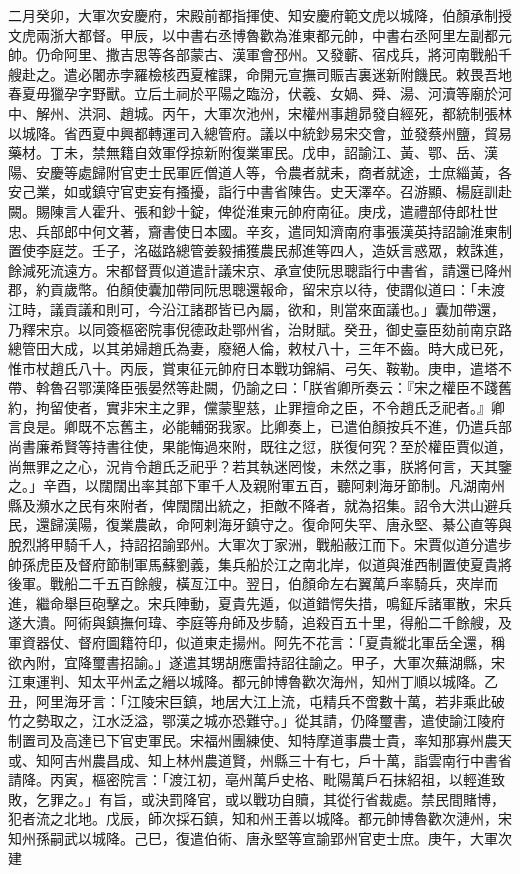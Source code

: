 \begin{pinyinscope}
 二月癸卯，大軍次安慶府，宋殿前都指揮使、知安慶府範文虎以城降，伯顏承制授文虎兩浙大都督。甲辰，以中書右丞博魯歡為淮東都元帥，中書右丞阿里左副都元帥。仍命阿里、撒吉思等各部蒙古、漢軍會邳州。又發蘄、宿戍兵，將河南戰船千艘赴之。遣必闍赤孛羅檢核西夏榷課，命開元宣撫司賑吉裏迷新附饑民。敕畏吾地春夏毋獵孕字野獸。立后土祠於平陽之臨汾，伏羲、女媧、舜、湯、河瀆等廟於河中、解州、洪洞、趙城。丙午，大軍次池州，宋權州事趙昴發自經死，都統制張林以城降。省西夏中興都轉運司入總管府。議以中統鈔易宋交會，並發蔡州鹽，貿易藥材。丁未，禁無籍自效軍俘掠新附復業軍民。戊申，詔諭江、黃、鄂、岳、漢陽、安慶等處歸附官吏士民軍匠僧道人等，令農者就耒，商者就途，士庶緇黃，各安己業，如或鎮守官吏妄有搔擾，詣行中書省陳告。史天澤卒。召游顯、楊庭訓赴闕。賜陳言人霍升、張和鈔十錠，俾從淮東元帥府南征。庚戌，遣禮部侍郎杜世忠、兵部郎中何文著，齎書使日本國。辛亥，遣同知濟南府事張漢英持詔諭淮東制置使李庭芝。壬子，洺磁路總管姜毅捕獲農民郝進等四人，造妖言惑眾，敕誅進，餘減死流遠方。宋都督賈似道遣計議宋京、承宣使阮思聰詣行中書省，請還已降州郡，約貢歲幣。伯顏使囊加帶同阮思聰還報命，留宋京以待，使謂似道曰：「未渡江時，議貢議和則可，今沿江諸郡皆已內屬，欲和，則當來面議也。」囊加帶還，乃釋宋京。以同簽樞密院事倪德政赴鄂州省，治財賦。癸丑，御史臺臣劾前南京路總管田大成，以其弟婦趙氏為妻，廢絕人倫，敕杖八十，三年不齒。時大成已死，惟市杖趙氏八十。丙辰，賞東征元帥府日本戰功錦絹、弓矢、鞍勒。庚申，遣塔不帶、斡魯召鄂漢降臣張晏然等赴闕，仍諭之曰：「朕省卿所奏云：『宋之權臣不踐舊約，拘留使者，實非宋主之罪，儻蒙聖慈，止罪擅命之臣，不令趙氏乏祀者。』卿言良是。卿既不忘舊主，必能輔弼我家。比卿奏上，已遣伯顏按兵不進，仍遣兵部尚書廉希賢等持書往使，果能悔過來附，既往之愆，朕復何究？至於權臣賈似道，尚無罪之之心，況肯令趙氏乏祀乎？若其執迷罔悛，未然之事，朕將何言，天其鑒之。」辛酉，以闊闊出率其部下軍千人及親附軍五百，聽阿剌海牙節制。凡湖南州縣及瀕水之民有來附者，俾闊闊出統之，拒敵不降者，就為招集。詔令大洪山避兵民，還歸漢陽，復業農畝，命阿剌海牙鎮守之。復命阿失罕、唐永堅、綦公直等與脫烈將甲騎千人，持詔招諭郢州。大軍次丁家洲，戰船蔽江而下。宋賈似道分遣步帥孫虎臣及督府節制軍馬蘇劉義，集兵船於江之南北岸，似道與淮西制置使夏貴將後軍。戰船二千五百餘艘，橫亙江中。翌日，伯顏命左右翼萬戶率騎兵，夾岸而進，繼命舉巨砲擊之。宋兵陣動，夏貴先遁，似道錯愕失措，鳴鉦斥諸軍散，宋兵遂大潰。阿術與鎮撫何瑋、李庭等舟師及步騎，追殺百五十里，得船二千餘艘，及軍資器仗、督府圖籍符印，似道東走揚州。阿先不花言：「夏貴縱北軍岳全還，稱欲內附，宜降璽書招諭。」遂遣其甥胡應雷持詔往諭之。甲子，大軍次蕪湖縣，宋江東運判、知太平州孟之縉以城降。都元帥博魯歡次海州，知州丁順以城降。乙丑，阿里海牙言：「江陵宋巨鎮，地居大江上流，屯精兵不啻數十萬，若非乘此破竹之勢取之，江水泛溢，鄂漢之城亦恐難守。」從其請，仍降璽書，遣使諭江陵府制置司及高達已下官吏軍民。宋福州團練使、知特摩道事農士貴，率知那寡州農天或、知阿吉州農昌成、知上林州農道賢，州縣三十有七，戶十萬，詣雲南行中書省請降。丙寅，樞密院言：「渡江初，亳州萬戶史格、毗陽萬戶石抹紹祖，以輕進致敗，乞罪之。」有旨，或決罰降官，或以戰功自贖，其從行省裁處。禁民間賭博，犯者流之北地。戊辰，師次採石鎮，知和州王善以城降。都元帥博魯歡次漣州，宋知州孫嗣武以城降。己巳，復遣伯術、唐永堅等宣諭郢州官吏士庶。庚午，大軍次建
\end{pinyinscope}
